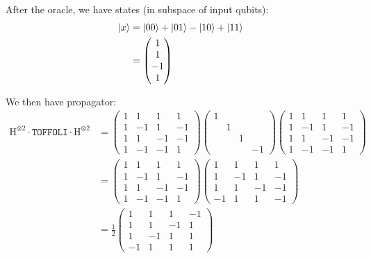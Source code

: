 \begin{parts}
	After the oracle, we have states (in subspace of input qubits):
	\begin{align*}
		\ket{x} &= \ket{00} + \ket{01} - \ket{10} + \ket{11} \\
		&= \begin{pmatrix}
			1 \\ 1 \\ -1 \\ 1
		\end{pmatrix}
	\end{align*}
	
	We then have propagator:
	\begin{align*}
		\mathrm{H}^{\otimes 2} \cdot \mathtt{TOFFOLI} \cdot \mathrm{H}^{\otimes 2} &=
		\begin{pmatrix}
			1 & 1 & 1 & 1 \\
			1 & -1 & 1 & -1 \\
			1 & 1 & -1 & -1 \\
			1 & -1 & -1 & 1
		\end{pmatrix}
		\begin{pmatrix}
			1 & & & \\
			& 1 & & \\
			& & 1 & \\
			& & & -1
		\end{pmatrix}
		\begin{pmatrix}
			1 & 1 & 1 & 1 \\
			1 & -1 & 1 & -1 \\
			1 & 1 & -1 & -1 \\
			1 & -1 & -1 & 1
		\end{pmatrix} \\
		&= \begin{pmatrix}
			1 & 1 & 1 & 1 \\
			1 & -1 & 1 & -1 \\
			1 & 1 & -1 & -1 \\
			1 & -1 & -1 & 1
		\end{pmatrix}
		\begin{pmatrix}
			1 & 1 & 1 & 1 \\
			1 & -1 & 1 & -1 \\
			1 & 1 & -1 & -1 \\
			-1 & 1 & 1 & -1
		\end{pmatrix} \\
		&= \frac{1}{2}
		\begin{pmatrix}
			1 & 1 & 1 & -1 \\
			1 & 1 & -1 & 1 \\
			1 & -1 & 1 & 1 \\
			-1 & 1 & 1 & 1
		\end{pmatrix}
	\end{align*}
	

\end{parts}
